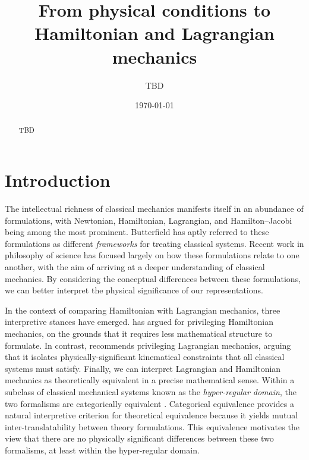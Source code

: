 \documentclass[letterpaper]{article}
\begin{document}
\title{From physical conditions to Hamiltonian and Lagrangian mechanics}
\author{TBD}

\date{\today}

\maketitle

\begin{abstract}
	TBD
\end{abstract}

\tableofcontents 


\section{Introduction}
\label{introduction}



The intellectual richness of classical mechanics manifests itself in an abundance of formulations, with Newtonian, Hamiltonian, Lagrangian, and Hamilton--Jacobi being among the most prominent.  Butterfield \parencites*[]{Butterfield2006} has aptly referred to these formulations as different \textit{frameworks} for treating classical systems. Recent work in philosophy of science has focused largely on how these formulations relate to one another, with the aim of arriving at a deeper understanding of classical mechanics. By considering the conceptual differences between these formulations, we can better interpret the physical significance of our representations.

In the context of comparing Hamiltonian with Lagrangian mechanics, three interpretive stances have emerged. \textcites[]{North} has argued for privileging Hamiltonian mechanics, on the grounds that it requires less mathematical structure to formulate. In contrast, \textcites[]{Curiel} recommends privileging Lagrangian mechanics, arguing that it isolates physically-significant kinematical constraints that all classical systems must satisfy. Finally, we can interpret Lagrangian and Hamiltonian mechanics as theoretically equivalent in a precise mathematical sense. Within a subclass of classical mechanical systems known as the \textit{hyper-regular domain}, the two formalisms are categorically equivalent \parencites[]{Teh}{Barrett2}. Categorical equivalence provides a natural interpretive criterion for theoretical equivalence because it yields mutual inter-translatability between theory formulations. This equivalence motivates the view that there are no physically significant differences between these two formalisms, at least within the hyper-regular domain. 
\end{document}

